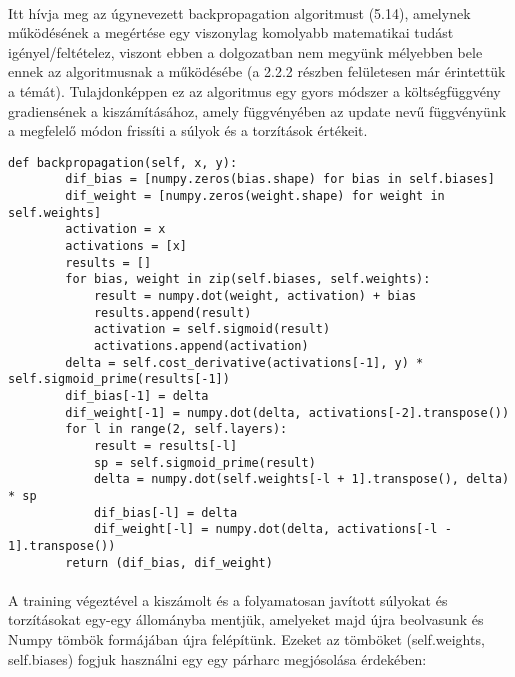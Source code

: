 \paragraph{}
Itt hívja meg az úgynevezett backpropagation algoritmust (5.14), amelynek működésének a megértése egy viszonylag komolyabb matematikai tudást igényel/feltételez, viszont ebben a dolgozatban nem megyünk mélyebben bele ennek az algoritmusnak a működésébe (a 2.2.2 részben felületesen már érintettük a témát). Tulajdonképpen ez az algoritmus egy gyors módszer a költségfüggvény gradiensének a kiszámításához, amely függvényében az update nevű függvényünk a megfelelő módon frissíti a súlyok és a torzítások értékeit.

\begin{lstlisting}[caption=A backpropagation algoritmus]
    def backpropagation(self, x, y):
        dif_bias = [numpy.zeros(bias.shape) for bias in self.biases]
        dif_weight = [numpy.zeros(weight.shape) for weight in self.weights]
        activation = x
        activations = [x]
        results = []
        for bias, weight in zip(self.biases, self.weights):
            result = numpy.dot(weight, activation) + bias
            results.append(result)
            activation = self.sigmoid(result)
            activations.append(activation)
        delta = self.cost_derivative(activations[-1], y) * self.sigmoid_prime(results[-1])
        dif_bias[-1] = delta
        dif_weight[-1] = numpy.dot(delta, activations[-2].transpose())
        for l in range(2, self.layers):
            result = results[-l]
            sp = self.sigmoid_prime(result)
            delta = numpy.dot(self.weights[-l + 1].transpose(), delta) * sp
            dif_bias[-l] = delta
            dif_weight[-l] = numpy.dot(delta, activations[-l - 1].transpose())
        return (dif_bias, dif_weight)
\end{lstlisting}

\paragraph{}
A training végeztével a kiszámolt és a folyamatosan javított súlyokat és torzításokat egy-egy állományba mentjük, amelyeket majd újra beolvasunk és Numpy tömbök formájában újra felépítünk. Ezeket az tömböket (self.weights, self.biases) fogjuk használni egy egy párharc megjósolása érdekében:

